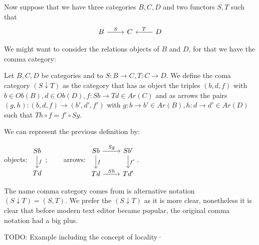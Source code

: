 Now suppose that we have three categories $B,C,D$ and two functors $S,T$ such that
\[
  \begin{tikzcd}
    B \ar[r, "S"] & C & D\ar[l, "T", swap]
  \end{tikzcd}
\]

We might want to consider the relations objects of $B$ and $D$, for that we have the comma category:


\begin{definition}
  Let $B,C,D$ be categories and to $S:B\to C,T: C\to D$. We define the coma category $(S\downarrow T)$ as the category that has as object the triples $(b,d,f)$ with $b\in Ob(B), d\in Ob(D), f:Sb\to Td\in Ar(C)$ and as arrows the pairs $(g,h):(b,d,f)\to (b',d',f')$ with $g:b\to b'\in Ar(B), h:d\to d'\in Ar(D)$ such that $Th \circ f = f' \circ Sg$. 
\end{definition}

We can represent the previous definition by:
\begin{center}
  objects: $
  \begin{tikzcd}
    Sb\ar[d,"f"]
    \\
    Td
  \end{tikzcd}
  $;$\qquad$ arrows: $\begin{tikzcd}
    Sb\ar[d,"f"]\ar[r,"Sg"] & Sb' \ar[d,"f'"]
    \\
    Td\ar[r,"Sh"] & Td'
  \end{tikzcd}$.
\end{center}


The name comma category comes from is alternative notation $(S\downarrow T) = (S,T)$. We prefer the $(S\downarrow T)$ as it is more clear, nonetheless it is clear that before modern text editor became popular, the original comma notation had a big plus.

\begin{example}
  TODO: Example including the concept of locality·
\end{example}
